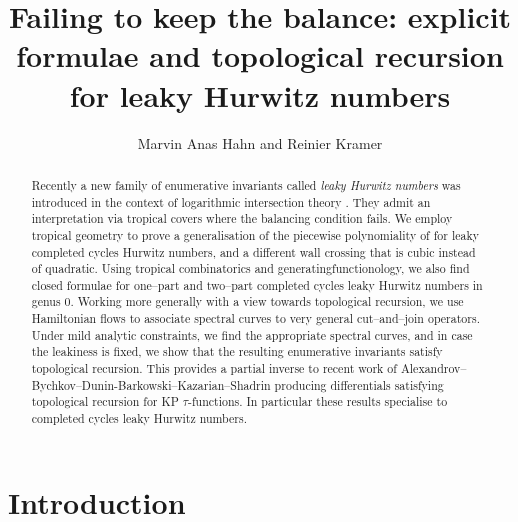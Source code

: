\documentclass[10pt,a4paper,oneside,no-math,reqno]{amsart}%
\theoremstyle{plain}
\theoremstyle{definition}
\theoremstyle{remark}
\numberwithin{equation}{section}
\newcommand{\1}{\mathds{1}}
\newcommand{\<}{\langle}
\renewcommand{\>}{\rangle}
\begin{document}
\title[Failing to keep the balance]{Failing to keep the balance: explicit formulae and topological recursion for leaky Hurwitz numbers}
\author{Marvin Anas Hahn and Reinier Kramer}
\date{}


\begin{abstract}
    Recently a new family of enumerative invariants called \emph{leaky Hurwitz numbers} was introduced in the context of logarithmic intersection theory \cite{CMR25}. They admit an interpretation via tropical covers where the balancing condition fails. We employ tropical geometry to prove a generalisation of the piecewise polynomiality of \cite{AKL25} for leaky completed cycles Hurwitz numbers, and a different wall crossing that is cubic instead of quadratic. Using tropical combinatorics and generatingfunctionology, we also find closed formulae for one--part and two--part completed cycles leaky Hurwitz numbers in genus $0$. Working more generally with a view towards topological recursion, we use Hamiltonian flows to associate spectral curves to very general cut--and--join operators. Under mild analytic constraints, we find the appropriate spectral curves, and in case the leakiness is fixed, we show that the resulting enumerative invariants satisfy topological recursion. This provides a partial inverse to recent work of Alexandrov--Bychkov--Dunin-Barkowski--Kazarian--Shadrin \cite{ABDKS24a} producing differentials satisfying topological recursion for KP $\tau$-functions. In particular these results specialise to completed cycles leaky Hurwitz numbers.
    \end{abstract}

\maketitle


\tableofcontents

\section{Introduction}
\end{document}
